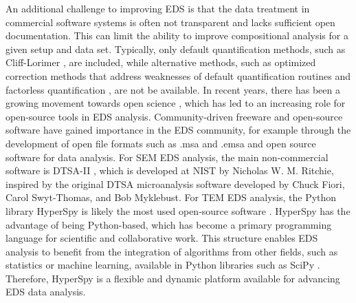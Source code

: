 An additional challenge to improving EDS is that the data treatment in commercial software systems is often not transparent and lacks sufficient open documentation.
This can limit the ability to improve compositional analysis for a given setup and data set.
Typically, only default quantification methods, such as Cliff-Lorimer \cite{CL1975}, are included, while alternative methods, such as optimized correction methods that address weaknesses of default quantification routines and factorless quantification \cite{nilsen_factorless_2021}, are not be available.
In recent years, there has been a growing movement towards open science \cite{opensource_2013}, which has led to an increasing role for open-source tools in EDS analysis.
Community-driven freeware and open-source software have gained importance in the EDS community, for example through the development of open file formats such as .msa and .emsa \cite{iso_emsa} and open source software for data analysis.
For SEM EDS analysis, the main non-commercial software is DTSA-II \cite{dtsaii_1_getting_started}, which is developed at NIST by Nicholas W. M. Ritchie, inspired by the original DTSA microanalysis software developed by Chuck Fiori, Carol Swyt-Thomas, and Bob Myklebust.
For TEM EDS analysis, the Python library HyperSpy \cite{hyperspy_1.7.1} is likely the most used open-source software .
HyperSpy has the advantage of being Python-based, which has become a primary programming language for scientific and collaborative work.
This structure enables EDS analysis to benefit from the integration of algorithms from other fields, such as statistics or machine learning, available in Python libraries such as SciPy \cite{2020SciPy}.
Therefore, HyperSpy is a flexible and dynamic platform available for advancing EDS data analysis.








